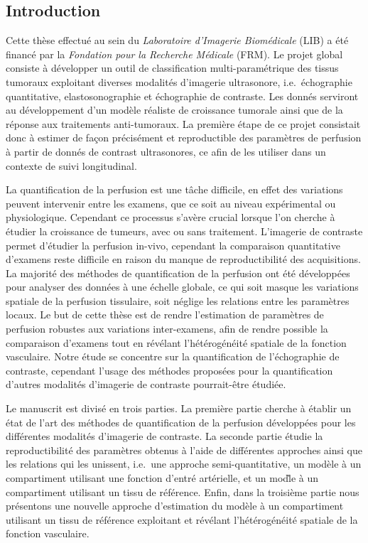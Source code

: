 \begin{otherlanguage}{francais}
\subsection*{Introduction}
Cette th\`ese effectu\'e au sein du {\em Laboratoire d'Imagerie Biom\'edicale} (LIB) a \'et\'e financ\'e par la {\em Fondation pour la Recherche M\'edicale} (FRM).
Le projet global consiste \`a d\'evelopper un outil de classification multi-param\'etrique des tissus tumoraux exploitant diverses modalit\'es d'imagerie ultrasonore, i.e.~\'echographie quantitative, elastosonographie et \'echographie de contraste.
Les donn\'es serviront au d\'eveloppement d'un mod\`ele r\'ealiste de croissance tumorale ainsi que de la r\'eponse aux traitements anti-tumoraux.
La premi\`ere \'etape de ce projet consistait donc \`a estimer de fa\c{c}on pr\'ecis\'ement et reproductible des param\`etres de perfusion \`a partir de donn\'es de contrast ultrasonores, ce afin de les utiliser dans un contexte de suivi longitudinal.

La quantification de la perfusion est une t\^ache difficile, en effet des variations peuvent intervenir entre les examens, que ce soit au niveau exp\'erimental ou physiologique. 
Cependant ce processus s'av\`ere crucial lorsque l'on cherche \`a \'etudier la croissance de tumeurs, avec ou sans traitement.
L'imagerie de contraste permet d'\'etudier la perfusion in-vivo, cependant la comparaison quantitative d'examens reste difficile en raison du manque de reproductibilit\'e des acquisitions.
La majorit\'e des m\'ethodes de quantification de la perfusion ont \'et\'e d\'evelopp\'ees pour analyser des donn\'ees \`a une \'echelle globale, ce qui soit masque les variations spatiale de la perfusion tissulaire, soit n\'eglige les relations entre les param\`etres locaux.
Le but de cette th\`ese est de rendre l'estimation de param\`etres de perfusion robustes aux variations inter-examens, afin de rendre possible la comparaison d'examens tout en r\'ev\'elant l'h\'et\'erog\'en\'eit\'e spatiale de la fonction vasculaire.
Notre \'etude se concentre sur la quantification de l'\'echographie de contraste, cependant l'usage des m\'ethodes propos\'ees pour la quantification d'autres modalit\'es d'imagerie de contraste pourrait-\^etre \'etudi\'ee.

Le manuscrit est divis\'e en trois parties.
La premi\`ere partie cherche \`a \'etablir un \'etat de l'art des m\'ethodes de quantification de la perfusion d\'evelopp\'ees pour les diff\'erentes modalit\'es d'imagerie de contraste.
La seconde partie \'etudie la reproductibilit\'e des param\`etres obtenus \`a l'aide de diff\'erentes approches ainsi que les relations qui les unissent, i.e.~une approche semi-quantitative, un mod\`ele \`a un compartiment utilisant une fonction d'entr\'e art\'erielle, et un mod\`le \`a un compartiment utilisant un tissu de r\'ef\'erence.
Enfin, dans la troisi\`eme partie nous pr\'esentons une nouvelle approche d'estimation du mod\`ele \`a un compartiment utilisant un tissu de r\'ef\'erence exploitant et r\'ev\'elant l'h\'et\'erog\'en\'eit\'e spatiale de la fonction vasculaire.


\end{otherlanguage}
